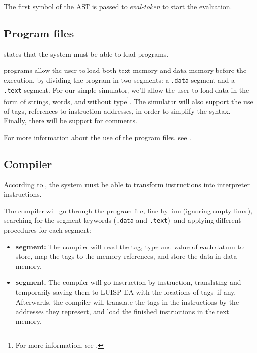 \noindent
The first symbol of the \gls{AST} is passed to \textit{eval-token} to start the evaluation.


\subsection{Program files}
 states that the system must be able to load  programs.

 programs allow the user to load both \gls{text memory} and \gls{data memory} before the execution, by dividing the program in two segments: a \texttt{.data} segment and a \texttt{.text} segment. For our simple simulator, we'll allow the user to load data in the form of strings, \glspl{word}, and without type\footnote{For more information, see .}. The simulator will also support the use of tags, references to instruction addresses, in order to simplify the  syntax. Finally, there will be support for comments.

\noindent
For more information about the use of the program files, see .


\subsection{Compiler}\label{subsec:compiler-design}
According to , the system must be able to transform  instructions into interpreter instructions.

The compiler will go through the program file, line by line (ignoring empty lines), searching for the segment keywords (\texttt{.data} and \texttt{.text}), and applying different procedures for each segment:
\begin{itemize}
  \item \textbf{ segment:} The compiler will read the tag, type and value of each datum to store, map the tags to the memory references, and store the data in \gls{data memory}.
  \item \textbf{ segment:} The compiler will go instruction by instruction, translating and temporarily saving them to LUISP-DA with the locations of tags, if any. Afterwards, the compiler will translate the tags in the instructions by the addresses they represent, and load the finished instructions in the \gls{text memory}.
\end{itemize}



